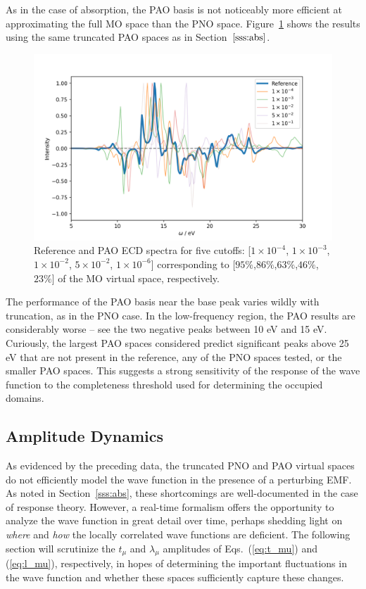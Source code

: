 As in the case of absorption, the PAO basis is not noticeably more efficient at
approximating the full MO space than the PNO space. Figure~\ref{fig:pao_ecd} 
shows the results using the same truncated PAO spaces as in Section~$\ref{sss:abs}$.
\begin{figure} 
    \centering
    \includegraphics[scale=.6]{p3/figures/pao_ecd.png}
    \caption{Reference and PAO ECD spectra for five cutoffs: 
    [$1\times 10^{-4}$, $1\times 10^{-3}$, $1\times 10^{-2}$, $5\times 10^{-2}$, 
    $1\times 10^{-6}$] corresponding to [$95\%$,$86\%$,$63\%$,$46\%$,$23\%$]
    of the MO virtual space, respectively.}
    \label{fig:pao_ecd}
\end{figure}
The performance of the PAO basis near the base peak varies wildly with truncation,
as in the PNO case. In the low-frequency region, the PAO results are considerably 
worse -- see the two negative peaks between 10 eV and 15 eV. Curiously, the 
largest PAO spaces considered predict significant peaks above 25 eV that are not 
present in the reference, any of the PNO spaces tested, or the smaller PAO
spaces. This suggests a strong sensitivity of the response of the wave function
to the completeness threshold used for determining the occupied domains.

\subsection{Amplitude Dynamics} \label{ss:amps}
As evidenced by the preceding data, the truncated PNO and PAO virtual spaces do not
efficiently model the wave function in the presence of a perturbing EMF. As noted in
Section~\ref{sss:abs}, these shortcomings are well-documented in the case of response
theory. However, a real-time formalism offers the opportunity to analyze the wave 
function in great detail over time, perhaps shedding light on \textit{where} and 
\textit{how} the locally correlated wave functions are deficient. The following
section will scrutinize the $t_\mu$ and $\lambda_\mu$ amplitudes of 
Eqs.~(\ref{eq:t_mu}) and (\ref{eq:l_mu}), respectively, in hopes of determining the 
important fluctuations in the wave function and whether these spaces sufficiently 
capture these changes.

